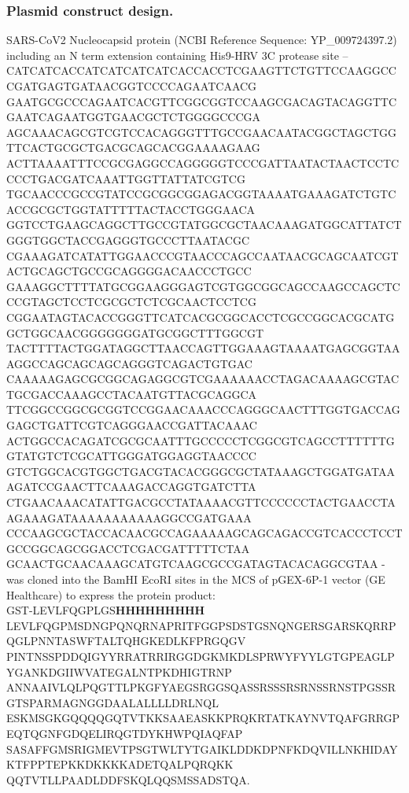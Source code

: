 \documentclass[../main.tex]{subfiles}
\begin{document}
    \subsubsection{Plasmid construct design.}
        SARS-CoV2 Nucleocapsid protein (NCBI Reference Sequence: YP\_009724397.2) including an N term extension containing His9-HRV 3C protease site – CATCATCACCATCATCATCATCACCACCTCGAAGTTCTGTTCCAAGGCCCGATGAGTGATAACGGTCCCCAGAATCAACG\\GAATGCGCCCAGAATCACGTTCGGCGGTCCAAGCGACAGTACAGGTTCGAATCAGAATGGTGAACGCTCTGGGGCCCGA\\AGCAAACAGCGTCGTCCACAGGGTTTGCCGAACAATACGGCTAGCTGGTTCACTGCGCTGACGCAGCACGGAAAAGAAG\\ACTTAAAATTTCCGCGAGGCCAGGGGGTCCCGATTAATACTAACTCCTCCCCTGACGATCAAATTGGTTATTATCGTCG\\TGCAACCCGCCGTATCCGCGGCGGAGACGGTAAAATGAAAGATCTGTCACCGCGCTGGTATTTTTACTACCTGGGAACA\\GGTCCTGAAGCAGGCTTGCCGTATGGCGCTAACAAAGATGGCATTATCTGGGTGGCTACCGAGGGTGCCCTTAATACGC\\CGAAAGATCATATTGGAACCCGTAACCCAGCCAATAACGCAGCAATCGTACTGCAGCTGCCGCAGGGGACAACCCTGCC\\GAAAGGCTTTTATGCGGAAGGGAGTCGTGGCGGCAGCCAAGCCAGCTCCCGTAGCTCCTCGCGCTCTCGCAACTCCTCG\\CGGAATAGTACACCGGGTTCATCACGCGGCACCTCGCCGGCACGCATGGCTGGCAACGGGGGGGATGCGGCTTTGGCGT\\TACTTTTACTGGATAGGCTTAACCAGTTGGAAAGTAAAATGAGCGGTAAAGGCCAGCAGCAGCAGGGTCAGACTGTGAC\\CAAAAAGAGCGCGGCAGAGGCGTCGAAAAAACCTAGACAAAAGCGTACTGCGACCAAAGCCTACAATGTTACGCAGGCA\\TTCGGCCGGCGCGGTCCGGAACAAACCCAGGGCAACTTTGGTGACCAGGAGCTGATTCGTCAGGGAACCGATTACAAAC\\ACTGGCCACAGATCGCGCAATTTGCCCCCTCGGCGTCAGCCTTTTTTGGTATGTCTCGCATTGGGATGGAGGTAACCCC\\GTCTGGCACGTGGCTGACGTACACGGGCGCTATAAAGCTGGATGATAAAGATCCGAACTTCAAAGACCAGGTGATCTTA\\CTGAACAAACATATTGACGCCTATAAAACGTTCCCCCCTACTGAACCTAAGAAAGATAAAAAAAAAAAGGCCGATGAAA\\CCCAAGCGCTACCACAACGCCAGAAAAAGCAGCAGACCGTCACCCTCCTGCCGGCAGCGGACCTCGACGATTTTTCTAA\\GCAACTGCAACAAAGCATGTCAAGCGCCGATAGTACACAGGCGTAA - was cloned into the BamHI EcoRI sites in the MCS of pGEX-6P-1 vector (GE Healthcare) to express the protein product: \\
        GST-LEVLFQGPLGS\textbf{HHHHHHHHH}\\LEVLFQGPMSDNGPQNQRNAPRITFGGPSDSTGSNQNGERSGARSKQRRPQGLPNNTASWFTALTQHGKEDLKFPRGQGV\\PINTNSSPDDQIGYYRRATRRIRGGDGKMKDLSPRWYFYYLGTGPEAGLPYGANKDGIIWVATEGALNTPKDHIGTRNP\\ANNAAIVLQLPQGTTLPKGFYAEGSRGGSQASSRSSSRSRNSSRNSTPGSSRGTSPARMAGNGGDAALALLLLDRLNQL\\ESKMSGKGQQQQGQTVTKKSAAEASKKPRQKRTATKAYNVTQAFGRRGPEQTQGNFGDQELIRQGTDYKHWPQIAQFAP\\SASAFFGMSRIGMEVTPSGTWLTYTGAIKLDDKDPNFKDQVILLNKHIDAYKTFPPTEPKKDKKKKADETQALPQRQKK\\QQTVTLLPAADLDDFSKQLQQSMSSADSTQA. 
\end{document}
